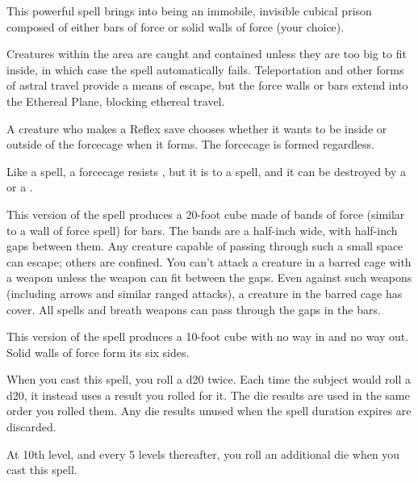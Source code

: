 \spellrng{\rngmed}
\begin{spelleffect}
  This powerful spell brings into being an immobile, invisible cubical prison composed of either bars of force or solid walls of force (your choice).
  \par Creatures within the area are caught and contained unless they are too big to fit inside, in which case the spell automatically fails. Teleportation and other forms of astral travel provide a means of escape, but the force walls or bars extend into the Ethereal Plane, blocking ethereal travel.
  \par A creature who makes a Reflex save chooses whether it wants to be inside or outside of the forcecage when it forms. The forcecage is formed regardless.
  \par Like a  spell, a forcecage resists , but it is \vulnerable to a  spell, and it can be destroyed by a  or a .
  \par {} This version of the spell produces a 20-foot cube made of bands of force (similar to a wall of force spell) for bars. The bands are a half-inch wide, with half-inch gaps between them. Any creature capable of passing through such a small space can escape; others are confined. You can't attack a creature in a barred cage with a weapon unless the weapon can fit between the gaps. Even against such weapons (including arrows and similar ranged attacks), a creature in the barred cage has cover. All spells and breath weapons can pass through the gaps in the bars.
  \par {} This version of the spell produces a 10-foot cube with no way in and no way out. Solid walls of force form its six sides.
\end{spelleffect}

\spellrng{\rngmed}
\spelldur{\durshort}
\begin{spelleffect}
    When you cast this spell, you roll a d20 twice. Each time the subject would roll a d20, it instead uses a result you rolled for it. The die results are used in the same order you rolled them. Any die results unused when the spell duration expires are discarded.

    At 10th level, and every 5 levels thereafter, you roll an additional die when you cast this spell.
\end{spelleffect}

